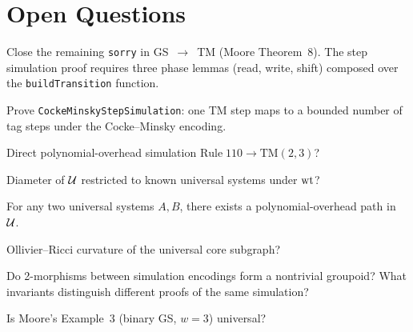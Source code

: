 \chapter{Open Questions}\label{ch:open}

\begin{question}\label{q-gs-tm-sorry}
Close the remaining \texttt{sorry} in GS~$\to$~TM (Moore Theorem~8). The step
simulation proof requires three phase lemmas (read, write, shift) composed
over the \texttt{buildTransition} function.
\end{question}

\begin{question}\label{q-cocke-minsky}
Prove \texttt{CockeMinskyStepSimulation}: one TM step maps to a bounded number
of tag steps under the Cocke--Minsky encoding.
\end{question}

\begin{question}\label{q-polynomial}
Direct polynomial-overhead simulation $\mathrm{Rule\;110} \to \mathrm{TM}(2,3)$?
\end{question}

\begin{question}\label{q-diameter}
Diameter of $\mathcal{U}$ restricted to known universal systems under $\mathrm{wt}$?
\end{question}

\begin{conjecture}\label{pce-conj}
\notready
For any two universal systems $A,B$, there exists a polynomial-overhead path
in~$\mathcal{U}$.
\end{conjecture}

\begin{question}\label{q-curvature}
Ollivier--Ricci curvature of the universal core subgraph?
\end{question}

\begin{question}\label{q-2morph}
Do 2-morphisms between simulation encodings form a nontrivial groupoid?
What invariants distinguish different proofs of the same simulation?
\end{question}

\begin{question}\label{q-moore-ex3}
Is Moore's Example~3 (binary GS, $w=3$) universal?
\end{question}
